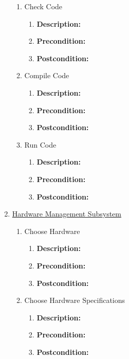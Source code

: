 \documentclass{article}
\begin{document}
\begin{enumerate}
\begin{enumerate}
        \item Check Code
		\begin{enumerate}
			\item \textbf{Description:} 
			\item \textbf{Precondition:}
			\item \textbf{Postcondition:}\newline
		\end{enumerate}
        
        \item Compile Code
		\begin{enumerate}
			\item \textbf{Description:} 
			\item \textbf{Precondition:}
			\item \textbf{Postcondition:}\newline
		\end{enumerate}
        
        \item Run Code
		\begin{enumerate}
			\item \textbf{Description:} 
			\item \textbf{Precondition:}
			\item \textbf{Postcondition:}\newline
		\end{enumerate}
        
   \end{enumerate}
        
	\item \underline{Hardware Management Subsystem}
    \begin{enumerate}
		\item Choose Hardware
        
		\begin{enumerate}
			\item \textbf{Description:} 
			\item \textbf{Precondition:}
			\item \textbf{Postcondition:}\newline
		\end{enumerate}
        
        \item Choose Hardware Specifications 
		\begin{enumerate}
			\item \textbf{Description:} 
			\item \textbf{Precondition:}
			\item \textbf{Postcondition:}\newline
		\end{enumerate}
        

\end{enumerate}
\end{enumerate}
\end{document}
